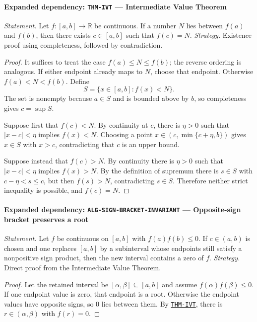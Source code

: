 \documentclass[10pt]{article}
\newcommand{\pidraw}[1]{\begingroup\urlstyle{tt}\nolinkurl{#1}\endgroup}
\newcommand{\pidref}[1]{\hyperref[prf:#1]{\pidraw{#1}}}
\newcommand{\pid}[1]{\pidref{#1}}
\theoremstyle{definition}
\theoremstyle{remark}
\begin{document}
\paragraph{Expanded dependency: \pidraw{THM-IVT} --- Intermediate Value Theorem}
\textit{Statement.} Let $f:[a,b]\to\mathbb{R}$ be continuous. If a number $N$ lies between
$f(a)$ and $f(b)$, then there exists $c\in[a,b]$ such that $f(c)=N$.
\textit{Strategy.} Existence proof using completeness, followed by contradiction.
\begin{proof}It suffices to treat the case $f(a)\le N\le f(b)$; the reverse ordering is analogous.
If either endpoint already maps to $N$, choose that endpoint. Otherwise
$f(a)<N<f(b)$. Define
\[
S=\{x\in[a,b]: f(x)<N\}.
\]
The set is nonempty because $a\in S$ and is bounded above by $b$, so completeness
gives $c=\sup S$.

Suppose first that $f(c)<N$. By continuity at $c$, there is $\eta>0$ such that
$|x-c|<\eta$ implies $f(x)<N$. Choosing a point
$x\in(c,\min\{c+\eta,b\})$ gives $x\in S$ with $x>c$, contradicting that $c$
is an upper bound.

Suppose instead that $f(c)>N$. By continuity there is $\eta>0$ such that
$|x-c|<\eta$ implies $f(x)>N$. By the definition of supremum there is
$s\in S$ with $c-\eta<s\le c$, but then $f(s)>N$, contradicting $s\in S$.
Therefore neither strict inequality is possible, and $f(c)=N$.\end{proof}

\paragraph{Expanded dependency: \pidraw{ALG-SIGN-BRACKET-INVARIANT} --- Opposite-sign bracket preserves a root}
\textit{Statement.} Let $f$ be continuous on $[a,b]$ with $f(a)f(b)\le0$. If $c\in(a,b)$ is chosen and one replaces $[a,b]$ by a subinterval whose endpoints still satisfy a nonpositive sign product, then the new interval contains a zero of $f$.
\textit{Strategy.} Direct proof from the Intermediate Value Theorem.
\begin{proof}Let the retained interval be $[\alpha,\beta]\subseteq[a,b]$ and assume
$f(\alpha)f(\beta)\le0$. If one endpoint value is zero, that endpoint is a root.
Otherwise the endpoint values have opposite signs, so $0$ lies between them.
By \pid{THM-IVT}, there is $r\in(\alpha,\beta)$ with $f(r)=0$.\end{proof}
\end{document}
